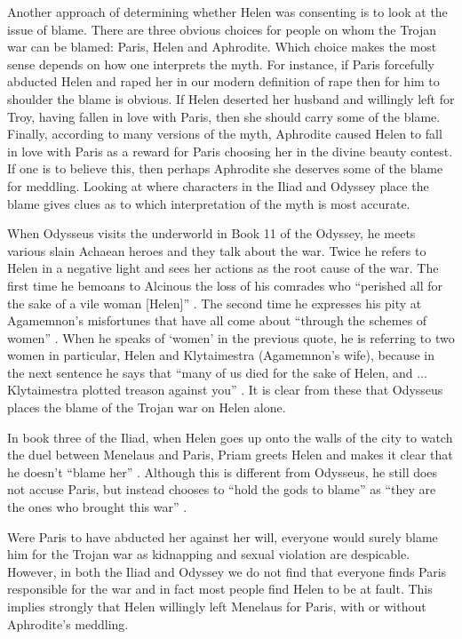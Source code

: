 \documentclass[11pt]{article}
\begin{document}
Another approach of determining whether Helen was consenting is to look at the issue of blame.
There are three obvious choices for people on whom the Trojan war can be blamed: Paris, Helen and Aphrodite.
Which choice makes the most sense depends on how one interprets the myth.
For instance, if Paris forcefully abducted Helen and raped her in our modern definition of rape then for him to shoulder the blame is obvious.
If Helen deserted her husband and willingly left for Troy, having fallen in love with Paris, then she should carry some of the blame.
Finally, according to many versions of the myth, Aphrodite caused Helen to fall in love with Paris as a reward for Paris choosing her in the divine beauty contest.
If one is to believe this, then perhaps Aphrodite she deserves some of the blame for meddling.
Looking at where characters in the Iliad and Odyssey place the blame gives clues as to which interpretation of the myth is most accurate.

When Odysseus visits the underworld in Book 11 of the Odyssey, he meets various slain Achaean heroes and they talk about the war.
Twice he refers to Helen in a negative light and sees her actions as the root cause of the war.
The first time he bemoans to Alcinous the loss of his comrades who ``perished all for the sake of a vile woman [Helen]'' \cite[book 11, line 384]{odyssey}.
The second time he expresses his pity at Agamemnon's misfortunes that have all come about ``through the schemes of women'' \cite[book 11, line 438]{odyssey}.
When he speaks of `women' in the previous quote, he is referring to two women in particular, Helen and Klytaimestra (Agamemnon's wife), because in the next sentence he says that ``many of us died for the sake of Helen, and ... Klytaimestra plotted treason against you'' \cite[book 11, line 438]{odyssey}.
It is clear from these that Odysseus places the blame of the Trojan war on Helen alone.

In book three of the Iliad, when Helen goes up onto the walls of the city to watch the duel between Menelaus and Paris, Priam greets Helen and makes it clear that he doesn't ``blame her'' \cite[book 3, line 198]{iliad}.
Although this is different from Odysseus, he still does not accuse Paris, but instead chooses to ``hold the gods to blame'' as ``they are the ones who brought this war'' \cite[book 3, line 200]{iliad}.

Were Paris to have abducted her against her will, everyone would surely blame him for the Trojan war as kidnapping and sexual violation are despicable.
However, in both the Iliad and Odyssey we do not find that everyone finds Paris responsible for the war and in fact most people find Helen to be at fault.
This implies strongly that Helen willingly left Menelaus for Paris, with or without Aphrodite's meddling.
\end{document}
